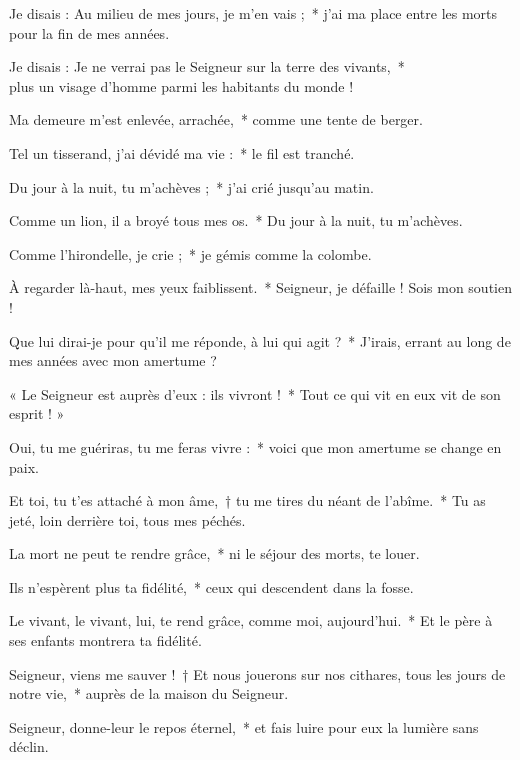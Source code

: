 \item Je disais : Au milieu de mes jours, je m’en vais ;~* j’ai ma place entre les morts pour la fin de mes années.

\item Je disais : Je ne verrai pas le Seigneur sur la terre des vivants,~*\\ plus un visage d’homme parmi les habitants du monde !

\item Ma demeure m’est enlevée, arrachée,~* comme une tente de berger.

\item Tel un tisserand, j’ai dévidé ma vie :~* le fil est tranché.

\item Du jour à la nuit, tu m’achèves ;~* j’ai crié jusqu’au matin.

\item Comme un lion, il a broyé tous mes os.~* Du jour à la nuit, tu m’achèves. 

\item Comme l’hirondelle, je crie ;~* je gémis comme la colombe.

\item À regarder là-haut, mes yeux faiblissent.~* Seigneur, je défaille ! Sois mon soutien !

\item Que lui dirai-je pour qu’il me réponde, à lui qui agit ?~* J’irais, errant au long de mes années avec mon amertume ?

\item « Le Seigneur est auprès d’eux : ils vivront !~* Tout ce qui vit en eux vit de son esprit ! »

\item Oui, tu me guériras, tu me feras vivre :~* voici que mon amertume se change en paix.

\item Et toi, tu t’es attaché à mon âme,~† tu me tires du néant de l’abîme.~* Tu as jeté, loin derrière toi, tous mes péchés.

\item La mort ne peut te rendre grâce,~* ni le séjour des morts, te louer.

\item Ils n’espèrent plus ta fidélité,~* ceux qui descendent dans la fosse.

\item Le vivant, le vivant, lui, te rend grâce, comme moi, aujourd’hui.~* Et le père à ses enfants montrera ta fidélité.

\item Seigneur, viens me sauver !~† Et nous jouerons sur nos cithares, tous les jours de notre vie,~* auprès de la maison du Seigneur.

\item Seigneur, donne-leur le repos éternel,~* et fais luire pour eux la lumière sans déclin.